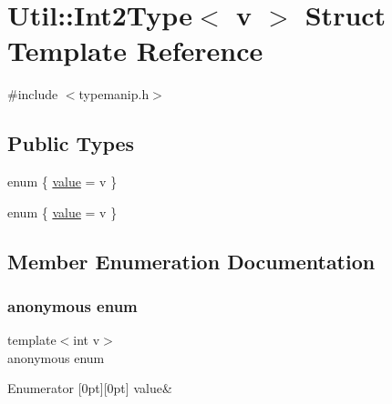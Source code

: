 \hypertarget{structUtil_1_1Int2Type}{}\section{Util\+:\+:Int2\+Type$<$ v $>$ Struct Template Reference}
\label{structUtil_1_1Int2Type}


{\ttfamily \#include $<$typemanip.\+h$>$}

\subsection*{Public Types}
\begin{DoxyCompactItemize}
\item 
enum \{ \mbox{\hyperlink{structUtil_1_1Int2Type_a0bd450c2f220057e03c1f7096674ce19a1518d2442ef74c1b5020549a8384f912}{value}} = v
 \}
\item 
enum \{ \mbox{\hyperlink{structUtil_1_1Int2Type_a0bd450c2f220057e03c1f7096674ce19a1518d2442ef74c1b5020549a8384f912}{value}} = v
 \}
\end{DoxyCompactItemize}


\subsection{Member Enumeration Documentation}
\mbox{\label{structUtil_1_1Int2Type_a0bd450c2f220057e03c1f7096674ce19}} 
\subsubsection{\texorpdfstring{anonymous enum}{anonymous enum}}
{\footnotesize\ttfamily template$<$int v$>$ \\
anonymous enum}

\begin{DoxyEnumFields}{Enumerator}
[0pt][0pt]{}\mbox{\label{structUtil_1_1Int2Type_a0bd450c2f220057e03c1f7096674ce19a1518d2442ef74c1b5020549a8384f912}} 
value&\\
\hline

\end{DoxyEnumFields}
\mbox{\label{structUtil_1_1Int2Type_ad8a2107f7e250720dbb6faf5faae5a80}} 
